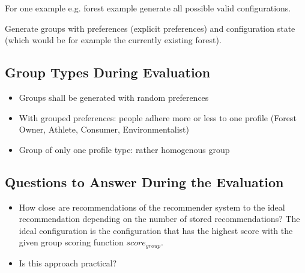 \documentclass{article}
\begin{document}
For one example e.g. forest example generate all possible valid configurations.

Generate groups with preferences (explicit preferences) and configuration state (which would be for example the currently existing forest).

\subsection{Group Types During Evaluation}
\begin{itemize}
    \item Groups shall be generated with random preferences
    \item With grouped preferences: people adhere more or less to one profile (Forest Owner, Athlete, Consumer, Environmentalist)
    \item Group of only one profile type: rather homogenous group
\end{itemize}

\subsection{Questions to Answer During the Evaluation}

\begin{itemize}
    \item How close are recommendations of the recommender system to the ideal recommendation depending on the number of stored recommendations? The ideal configuration is the configuration that has the highest score with the given group scoring function $score_{group}$.
    \item Is this approach practical?
\end{itemize}
\end{document}
